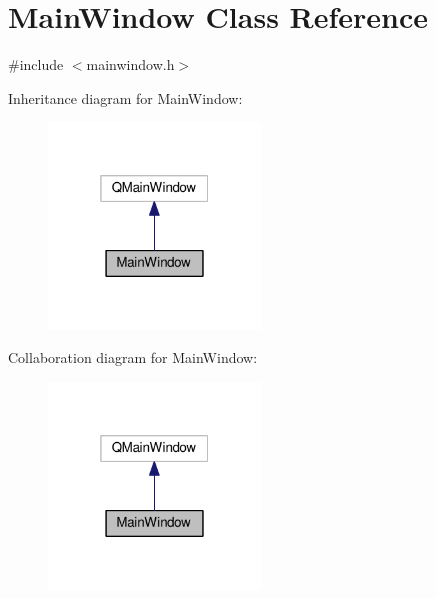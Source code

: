 \hypertarget{classMainWindow}{}\section{Main\+Window Class Reference}
\label{classMainWindow}


{\ttfamily \#include $<$mainwindow.\+h$>$}



Inheritance diagram for Main\+Window\+:
\nopagebreak
\begin{figure}[H]
\begin{center}
\leavevmode
\includegraphics[width=160pt]{classMainWindow__inherit__graph}
\end{center}
\end{figure}


Collaboration diagram for Main\+Window\+:
\nopagebreak
\begin{figure}[H]
\begin{center}
\leavevmode
\includegraphics[width=160pt]{classMainWindow__coll__graph}
\end{center}
\end{figure}
